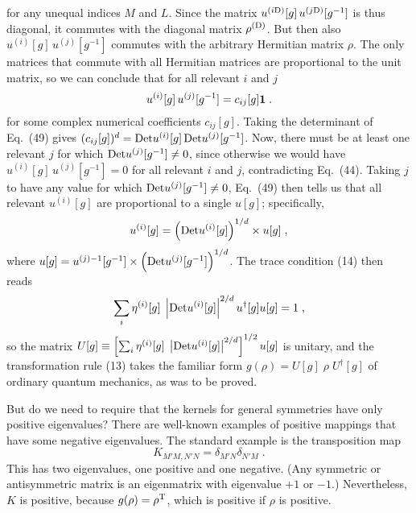 for any unequal indices $M$ and $L$.
Since the matrix $u^{(i{\rm D})}[g]\,u^{(j{\rm D})}[g^{-1}]$ is thus diagonal, it commutes with 
the diagonal matrix $\rho^{(\rm D)}$.  But then also $u^{(i)}[g]\,u^{(j)}[g^{-1}]$ commutes with the arbitrary Hermitian matrix $\rho$.  The only matrices that commute with all Hermitian matrices are proportional to the unit matrix, so we can conclude that for all relevant $i$ and $j$
\begin{equation}
u^{(i)}[g]\,u^{(j)}[g^{-1}]=c_{ij}[g]{\mbox{\boldmath{$1$}}}\;.
\end{equation}
for some complex numerical coefficients $c_{ij}[g]$.  Taking the determinant of Eq.~(49) gives $(c_{ij}[g])^d={\rm Det}  
u^{(i)}[g]\,{\rm Det}u^{(j)}[g^{-1}]$.  Now, there must be at least one relevant $j$ for which ${\rm Det}u^{(j)}[g^{-1}] \neq 0$, since otherwise we would have $u^{(i)}[g]\,u^{(j)}[g^{-1}]=0$ for all relevant $i$ and $j$, contradicting Eq.~(44).  Taking $j$ to have any value for which ${\rm Det}u^{(j)}[g^{-1}] \neq 0$, Eq.~(49) then tells us that all relevant $u^{(i)}[g]$ are proportional to a single $u[g]$; specifically,
\begin{eqnarray}
u^{(i)}[g]=\Big({\rm Det} u^{(i)}[g]\Big)^{1/d}\times u[g]\;,
\end{eqnarray}
where $u[g]=u^{(j)-1}[g^{-1}]\times {\rm \Big(Det}u^{(j)}[g^{-1}]\Big)^{1/d}$.    The trace condition (14) then reads 
$$ \sum_i \eta^{(i)}[g]\;\left |{\rm Det} u^{(i)}[g]\right|^{2/d} u^\dagger[g]u[g]=1\;,$$
so the matrix  $U[g]\equiv \left[\sum_i \eta^{(i)}[g]\;\left |{\rm Det} u^{(i)}[g]\right|^{2/d}\right]^{1/2} u[g]$ is unitary, and the transformation rule (13) takes  the familiar form $g(\rho)=U[g]\;\rho\;U^{\dagger}[g]$ of ordinary quantum mechanics, as was to be proved.





But do we need to require that the kernels for general symmetries have only positive eigenvalues?  There are well-known examples of positive mappings that have some negative eigenvalues.  The standard example is the transposition map
$$K_{M'M,N'N}=\delta_{M'N}\delta_{N'M}\;.$$
This has two eigenvalues, one positive and one negative.  (Any symmetric or antisymmetric matrix is an eigenmatrix with eigenvalue $+1$ or $-1$.)  Nevertheless,  $K$ is positive, because $g(\rho)=\rho^{\rm T}$, which is positive if $\rho$ is positive.  


